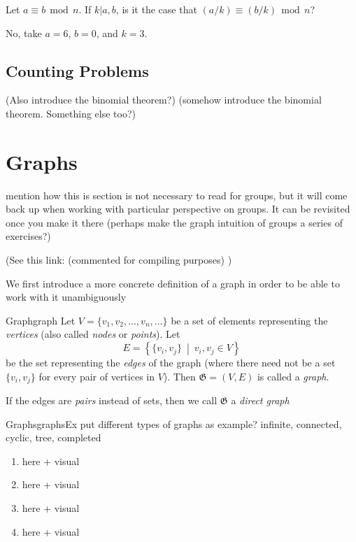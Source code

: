 \documentclass{book}
\renewcommand{\mid}{\big|}
\newcommand{\set}[2]{\left\{#1 \ \middle|\ #2\right\}}
\renewcommand{\mod}{\,\operatorname{mod}\,}
\begin{document}
\begin{Exercise}[label=ex:numberTheory]
  \Question Let $a\equiv b \mod n$. If $k\mid a,b$, is it the case that $(a/k) \equiv (b/k)\mod n$?
\end{Exercise}
\begin{Answer}[ref={ex:numberTheory}]
  \Question No, take $a = 6$, $b = 0$, and $k = 3$.
\end{Answer}

\subsection{Counting Problems}

(Also introduce the binomial theorem?)
(somehow introduce the binomial theorem. Something else too?)
\newpage
\section{Graphs}\label{sec:graphs}

mention how this is section is not necessary to read for groups, but it will come back up when working with particular
perspective on groups. It can be revisited once you make it there (perhaps make the graph intuition of groups a series
of exercises?)

(See this link: (commented for compiling purposes) %
)

We first introduce a more concrete definition of a graph in order to be able to work with it unambiguously

\begin{defn}{Graph}{graph}
	Let $V = \{ v_1, v_2, ..., v_n, ...\}$ be a set of elements representing the \emph{vertices} (also called \emph{nodes}
	or \emph{points}). Let
	\[
		E = \set{\{v_i, v_j\}}{v_i,v_j \in V}
	\]
	be the set representing the \emph{edges} of the graph (where there need not be a set $\{v_i, v_j\}$ for every pair of vertices in
	$V$). Then $\mathfrak{G} = (V, E)$ is called a \emph{graph}.

	If the edges are \emph{pairs} instead of sets, then we call $\mathfrak{G}$ a \emph{direct graph}
\end{defn}

\begin{example}{Graphs}{graphsEx}
	put different types of graphs as example? infinite, connected, cyclic, tree, completed
	\begin{enumerate}
		\item here + visual
		\item here + visual
		\item here + visual
		\item here + visual
	\end{enumerate}
\end{example}
\end{document}
